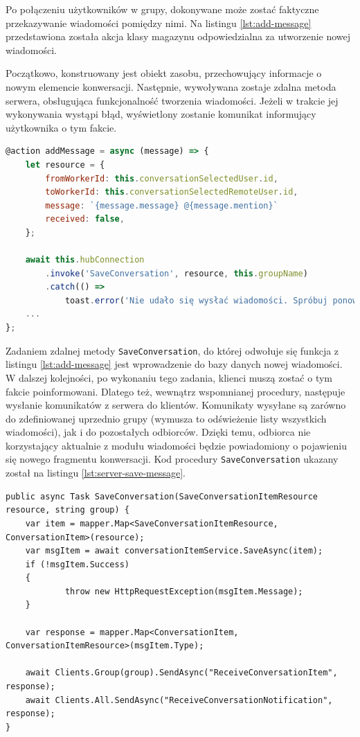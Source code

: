 Po połączeniu użytkowników w grupy, dokonywane może zostać faktyczne przekazywanie wiadomości pomiędzy nimi. Na listingu \ref{lst:add-message} przedstawiona została akcja klasy magazynu odpowiedzialna za utworzenie nowej wiadomości.

Początkowo, konstruowany jest obiekt zasobu, przechowujący informacje o nowym elemencie konwersacji. Następnie, wywoływana zostaje zdalna metoda serwera, obsługująca funkcjonalność tworzenia wiadomości. Jeżeli w trakcie jej wykonywania wystąpi błąd, wyświetlony zostanie komunikat informujący użytkownika o tym fakcie.

\begin{lstlisting}[label=lst:add-message,caption=Kod akcji utworzenia nowej wiadomości tekstowej, captionpos=b,basicstyle=\footnotesize\ttfamily,language=JavaScript]
@action addMessage = async (message) => {
	let resource = {
		fromWorkerId: this.conversationSelectedUser.id,
		toWorkerId: this.conversationSelectedRemoteUser.id,
		message: `{message.message} @{message.mention}`
		received: false,
	};

	await this.hubConnection
		.invoke('SaveConversation', resource, this.groupName)
		.catch(() =>
			toast.error('Nie udało się wysłać wiadomości. Spróbuj ponownie później'));
	...
};
\end{lstlisting}

Zadaniem zdalnej metody \texttt{SaveConversation}, do której odwołuje się funkcja z listingu \ref{lst:add-message} jest wprowadzenie do bazy danych nowej wiadomości. W dalszej kolejności, po wykonaniu tego zadania, klienci muszą zostać o tym fakcie poinformowani. Dlatego też, wewnątrz wspomnianej procedury, następuje wysłanie komunikatów z serwera do klientów. Komunikaty wysyłane są zarówno do zdefiniowanej uprzednio grupy (wymusza to odświeżenie listy wszystkich wiadomości), jak i do pozostałych odbiorców. Dzięki temu, odbiorca nie korzystający aktualnie z modułu wiadomości będzie powiadomiony o pojawieniu się nowego fragmentu konwersacji. Kod procedury \texttt{SaveConversation} ukazany został na listingu \ref{lst:server-save-message}.

\begin{lstlisting}[label=lst:server-save-message,caption=Kod metody serwera realizującej utworzenie nowej wiadomości tekstowej, captionpos=b,basicstyle=\footnotesize\ttfamily,style=sharpcstyle,language={[Sharp]C}]
public async Task SaveConversation(SaveConversationItemResource resource, string group) {
	var item = mapper.Map<SaveConversationItemResource, ConversationItem>(resource);
	var msgItem = await conversationItemService.SaveAsync(item);
	if (!msgItem.Success)
	{
			throw new HttpRequestException(msgItem.Message);
	}

	var response = mapper.Map<ConversationItem, ConversationItemResource>(msgItem.Type);

	await Clients.Group(group).SendAsync("ReceiveConversationItem", response);
	await Clients.All.SendAsync("ReceiveConversationNotification", response);
}
\end{lstlisting}

